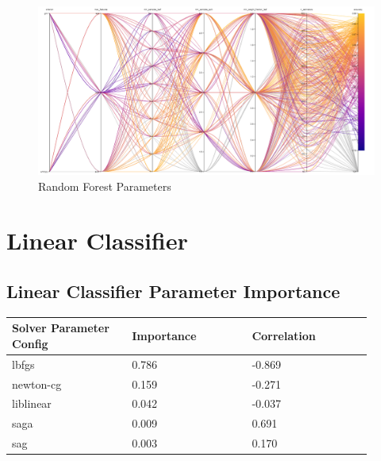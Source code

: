 \documentclass[11pt]{article}
\begin{document}
\begin{figure}[h]
    \caption {Random Forest Parameters} \label{ParallelCoordRF}
    \centering 
    \includegraphics[width = \textwidth, height = \textwidth, keepaspectratio]{Images/RF ParallelCoordGraph.png}
\end{figure}


  
  \FloatBarrier
\newpage
\section{Linear Classifier}

\subsection{Linear Classifier Parameter Importance}
  \begin{table}[ht]
    \centering
    \begin{tabular}{|p{0.3\linewidth} | p{0.3\linewidth}| p{0.3\linewidth}|} 
      \hline
      \textbf{Solver Parameter Config}  & \textbf{Importance} & \textbf{Correlation} \\ \hline
      lbfgs & 0.786 & -0.869 \\ \hline
      newton-cg & 0.159 & -0.271 \\ \hline
      liblinear & 0.042 & -0.037 \\ \hline
      saga & 0.009 & 0.691 \\ \hline
      sag & 0.003 & 0.170 \\ \hline
    \end{tabular}
  \end{table}\label{LC_ParamImp1}
\end{document}
